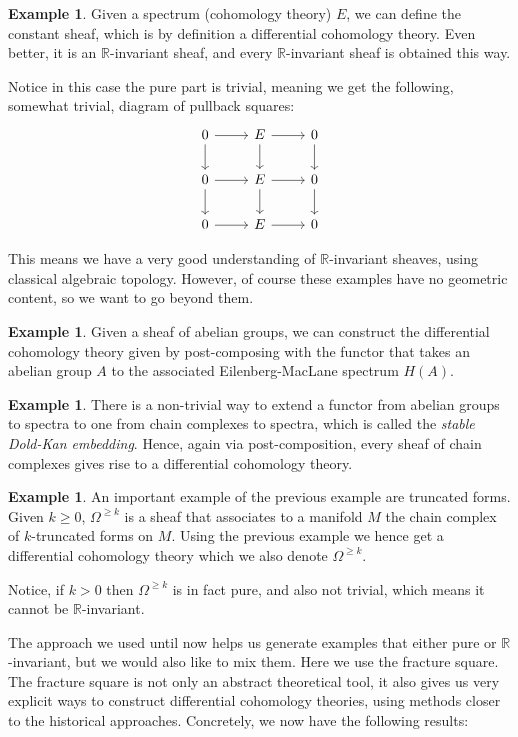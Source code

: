 \documentclass[10pt]{amsart}
\newcommand{\bR}{\mathbb{R}}
\theoremstyle{definition}
\newtheorem{example}[equation]{Example}
\theoremstyle{remark}
\numberwithin{equation}{section}
\begin{document}
\begin{example}
  Given a spectrum (cohomology theory) $E$, we can define the constant sheaf, which is by definition a differential cohomology theory. Even better, it is an $\bR$-invariant sheaf, and every $\bR$-invariant sheaf is obtained this way.

  Notice in this case the pure part is trivial, meaning we get the following, somewhat trivial, diagram of pullback squares:
  \[
  \begin{tikzcd}
    0 \arrow[d] \arrow[r] & E \arrow[r] \arrow[d] & 0 \arrow[d] \\ 
     0 \arrow[r] \arrow[d] & E \arrow[r] \arrow[d] & 0 \arrow[d] \\ 
    0 \arrow[r] & E \arrow[r] & 0
  \end{tikzcd}
 \]
\end{example}

This means we have a very good understanding of $\bR$-invariant sheaves, using classical algebraic topology. However, of course these examples have no geometric content, so we want to go beyond them.

\begin{example}
  Given a sheaf of abelian groups, we can construct the differential cohomology theory given by post-composing with the functor that takes an abelian group $A$ to the associated Eilenberg-MacLane spectrum $H(A)$. 
\end{example}

\begin{example}
  There is a non-trivial way to extend a functor from abelian groups to spectra to one from chain complexes to spectra, which is called the \emph{stable Dold-Kan embedding}. Hence, again via post-composition, every sheaf of chain complexes gives rise to a differential cohomology theory.
\end{example}

\begin{example}
 An important example of the previous example are truncated forms. Given $k \geq 0$, $\Omega^{\geq k}$ is a sheaf that associates to a manifold $M$ the chain complex of $k$-truncated forms on $M$. Using the previous example we hence get a differential cohomology theory which we also denote $\Omega^{\geq k }$.

 Notice, if $k > 0$ then $\Omega^{\geq k}$ is in fact pure, and also not trivial, which means it cannot be $\bR$-invariant.
\end{example}

The approach we used until now helps us generate examples that either pure or $\bR$-invariant, but we would also like to mix them. Here we use the fracture square. The fracture square is not only an abstract theoretical tool, it also gives us very explicit ways to construct differential cohomology theories, using methods closer to the historical approaches. Concretely, we now have the following results:
\end{document}

